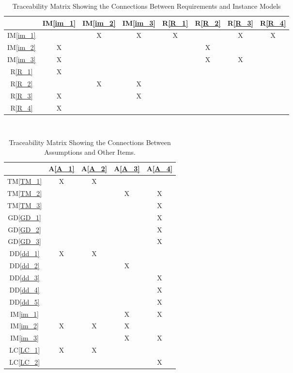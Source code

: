 \documentclass[12pt]{article}
\newcommand{\dref}[1]{GD\ref{#1}}
\newcommand{\ddref}[1]{DD\ref{#1}}
\newcommand{\tref}[1]{TM\ref{#1}}
\newcommand{\aref}[1]{A\ref{#1}}
\newcommand{\iref}[1]{IM\ref{#1}}
\newcommand{\rref}[1]{R\ref{#1}}
\newcommand{\lcref}[1]{LC\ref{#1}}
\begin{document}
\begin{table}[h!]
\centering
\begin{tabular}{|c|c|c|c|c|c|c|c|}
\hline
	& \iref{im_1}& \iref{im_2}& \iref{im_3}& \rref{R_1}& \rref{R_2}& \rref{R_3}& \rref{R_4} \\
\hline
\iref{im_1}            & & X& X& X& & X& X \\ \hline
\iref{im_2}            &X & & & & X& &  \\ \hline
\iref{im_3}          & X& & & & X&X &  \\ \hline
\rref{R_1}          &X & & & & & &  \\ \hline
\rref{R_2}         & & X& X& & & & \\ \hline
\rref{R_3}        &X & & X& & & & \\ \hline
\rref{R_4}        & X& & & & & & \\ 
\hline
\end{tabular}
\caption{Traceability Matrix Showing the Connections Between Requirements and Instance Models}
\label{Table:R_trace}
\end{table}
~\newline

\begin{table}[h!]
\centering
\begin{tabular}{|c|c|c|c|c|}
\hline
	& \aref{A_1}&  \aref{A_2}&  \aref{A_3}&  \aref{A_4} \\
\hline
\tref{TM_1}     &X &X &  &  \\ \hline
\tref{TM_2}     & & &X &X \\ \hline
\tref{TM_3}     & & & &X   \\ \hline
\dref{GD_1}     & & & &X \\ \hline
\dref{GD_2}    & & & &X    \\ \hline
\dref{GD_3} & & & &X \\ \hline
\ddref{dd_1} &X &X & &  \\ \hline
\ddref{dd_2}  & & & X&  \\ \hline
\ddref{dd_3}    & & & &X   \\ \hline
\ddref{dd_4}     & & & &X \\ \hline
\ddref{dd_5}     & & & &X   \\ \hline
\iref{im_1}     & & &X &X  \\ \hline
\iref{im_2}     &X &X &X & \\ \hline
\iref{im_3}    & & & X&X  \\ \hline
\lcref{LC_1}   &X &X & &  \\ \hline
\lcref{LC_2}        & & & &X \\ 
\hline
\end{tabular}
\caption{Traceability Matrix Showing the Connections Between Assumptions and Other Items.}
\label{Table:A_trace}
\end{table}
\newpage
\end{document}

